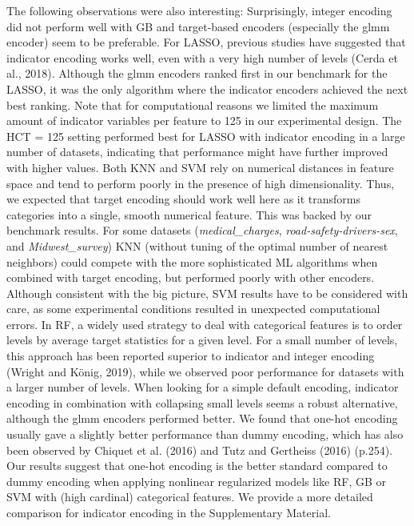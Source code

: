 \documentclass[smallextended]{svjour3}       %
\begin{document}
The following observations were also interesting:
Surprisingly, integer encoding did not perform well with GB and target-based encoders (especially the glmm encoder) seem to be preferable.
For LASSO, previous studies have suggested that indicator encoding works well, even with a very high number of levels (Cerda et al., 2018).
Although the glmm encoders ranked first in our benchmark for the LASSO, it was the only algorithm where the indicator encoders achieved the next best ranking.
Note that for computational reasons we limited the maximum amount of indicator variables per feature to 125 in our experimental design.
The HCT = 125 setting performed best for LASSO with indicator encoding in a large number of datasets, indicating that performance might have further improved with higher values.
Both KNN and SVM rely on numerical distances in feature space and tend to perform poorly in the presence of high dimensionality.
Thus, we expected that target encoding should work well here as it transforms categories into a single, smooth numerical feature.
This was backed by our benchmark results.
For some datasets (\emph{medical\_charges}, \emph{road-safety-drivers-sex}, and \emph{Midwest\_survey}) KNN (without tuning of the optimal number of nearest neighbors) could compete with the more sophisticated ML algorithms when combined with target encoding, but performed poorly with other encoders.
Although consistent with the big picture, SVM results have to be considered with care, as some experimental conditions resulted in unexpected computational errors.
In RF, a widely used strategy to deal with categorical features is to order levels by average target statistics for a given level.
For a small number of levels, this approach has been reported superior to indicator and integer encoding (Wright and König, 2019), while we observed poor performance for datasets with a larger number of levels.
When looking for a simple default encoding, indicator encoding in combination with collapsing small levels seems a robust alternative, although the glmm encoders performed better.
We found that one-hot encoding usually gave a slightly better performance than dummy encoding, which has also been observed by Chiquet et al. (2016) and Tutz and Gertheiss (2016) (p.254).
Our results suggest that one-hot encoding is the better standard compared to dummy encoding when applying nonlinear regularized models like RF, GB or SVM with (high cardinal) categorical features.
We provide a more detailed comparison for indicator encoding in the Supplementary Material.
\end{document}
